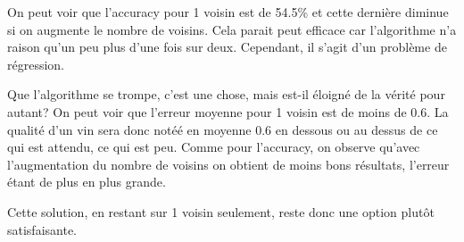 \newpage

On peut voir que l'accuracy pour 1 voisin est de 54.5\% et cette dernière diminue si on augmente le nombre de voisins.
Cela parait peut efficace car l'algorithme n'a raison qu'un peu plus d'une fois sur deux. Cependant, il s'agit d'un problème
de régression.

Que l'algorithme se trompe, c'est une chose, mais est-il éloigné de la vérité pour autant? On peut voir que
l'erreur moyenne pour 1 voisin est de moins de 0.6. La qualité d'un vin sera donc notéé en moyenne 0.6 en dessous ou au dessus
de ce qui est attendu, ce qui est peu. Comme pour l'accuracy, on observe qu'avec l'augmentation du nombre de voisins on obtient
de moins bons résultats, l'erreur étant de plus en plus grande.

\vspace{0.5cm}


Cette solution, en restant sur 1 voisin seulement, reste donc une option plutôt satisfaisante.